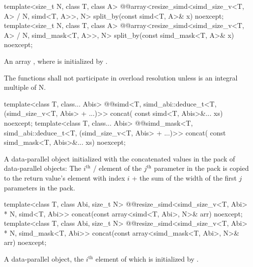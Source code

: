 \begin{itemdecl}
template<size_t N, class T, class A>
  @@array<resize_simd<simd_size_v<T, A> / N, simd<T, A>>, N>
    split_by(const simd<T, A>& x) noexcept;
template<size_t N, class T, class A>
  @@array<resize_simd<simd_size_v<T, A> / N, simd_mask<T, A>>, N>
    split_by(const simd_mask<T, A>& x) noexcept;
\end{itemdecl}

\begin{itemdescr}
  \pnum\returns
  An array , where  is initialized by .

  \pnum\remarks
  The functions shall not participate in overload resolution unless  is an integral multiple of \tcode N.
\end{itemdescr}

\begin{itemdecl}
template<class T, class... Abis>
  @@simd<T, simd_abi::deduce_t<T, (simd_size_v<T, Abis> + ...)>> concat(
    const simd<T, Abis>&... xs) noexcept;
template<class T, class... Abis>
  @@simd_mask<T, simd_abi::deduce_t<T, (simd_size_v<T, Abis> + ...)>> concat(
    const simd_mask<T, Abis>&... xs) noexcept;
\end{itemdecl}

\begin{itemdescr}
  \pnum\returns
  A data-parallel object initialized with the concatenated values in the  pack of data-parallel objects: The $i^\text{th}$ / element of the $j^\text{th}$ parameter in the  pack is copied to the return value's element with index $i$ + the sum of the width of the first $j$ parameters in the  pack.
\end{itemdescr}

\begin{itemdecl}
  template<class T, class Abi, size_t N>
    @@resize_simd<simd_size_v<T, Abi> * N, simd<T, Abi>>
      concat(const array<simd<T, Abi>, N>& arr) noexcept;
  template<class T, class Abi, size_t N>
    @@resize_simd<simd_size_v<T, Abi> * N, simd_mask<T, Abi>>
      concat(const array<simd_mask<T, Abi>, N>& arr) noexcept;
\end{itemdecl}

\begin{itemdescr}
  \pnum\returns
  A data-parallel object, the $i^\text{th}$ element of which is initialized by .
\end{itemdescr}

